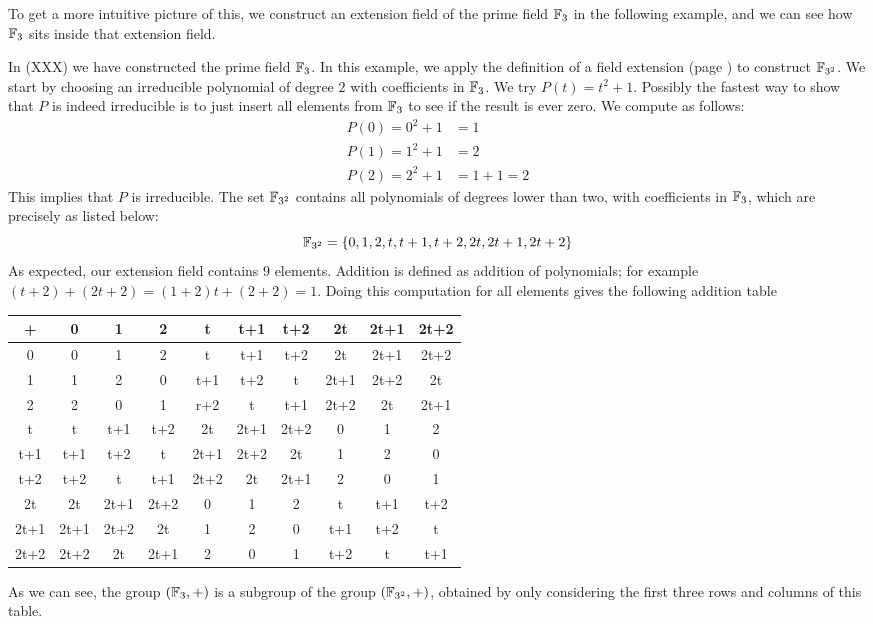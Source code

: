 To get a more intuitive picture of this, we construct an extension field of the prime field  $\mathbb{F}_3$ in the following example, and we can see how $\mathbb{F}_3$ sits inside that extension field.
\begin{example}In (XXX) we have constructed the prime field $\mathbb{F}_3$. In this example, we apply the definition of a field extension (page \pageref{field-extension}) to construct $\mathbb{F}_{3^2}$. We start by choosing an irreducible polynomial of degree $2$ with coefficients in $\mathbb{F}_3$. We try
$P(t)=t^2+1$. Possibly the fastest way to show that $P$ is indeed irreducible is to just insert all elements from $\mathbb{F}_3$ to see if the result is ever zero. We compute as follows:
\begin{align*}
P(0) = 0^2+1 &= 1\\
P(1) = 1^2+1 &= 2\\
P(2) = 2^2+1 &=  1+1  = 2
\end{align*}
This implies that $P$ is irreducible. The set $\mathbb{F}_{3^2}$ contains all polynomials of degrees lower than two, with coefficients in $\mathbb{F}_3$, which are precisely as listed below:
$$
\mathbb{F}_{3^2}=\{0,1,2,t,t+1,t+2,2t,2t+1,2t+2\}
$$
As expected, our extension field contains $9$ elements. Addition is  defined as addition of polynomials; for example $(t+2) + (2t+2)= (1+2)t +(2+2)= 1$. Doing this computation for all elements gives the following addition table
\begin{center}
  \begin{tabular}{c | c c c c c c c c c}
    + & 0    & 1    & 2    & t    & t+1  & t+2  & 2t   & 2t+1 & 2t+2 \\\hline
    0 & 0    & 1    & 2    & t    & t+1  & t+2  & 2t   & 2t+1 & 2t+2 \\
    1 & 1    & 2    & 0    & t+1  & t+2  & t    & 2t+1 & 2t+2 & 2t   \\
    2 & 2    & 0    & 1    & r+2  & t    & t+1  & 2t+2 & 2t   & 2t+1 \\
    t & t    & t+1  & t+2  & 2t   & 2t+1 & 2t+2 & 0    & 1    & 2    \\
  t+1 & t+1  & t+2  & t    & 2t+1 & 2t+2 & 2t   & 1    & 2    & 0    \\
  t+2 & t+2  & t    & t+1  & 2t+2 & 2t   & 2t+1 & 2    & 0    & 1    \\
   2t & 2t   & 2t+1 & 2t+2 & 0    & 1    & 2    & t    & t+1  & t+2  \\
 2t+1 & 2t+1 & 2t+2 & 2t   & 1    & 2    & 0    & t+1  & t+2  & t    \\
 2t+2 & 2t+2 & 2t   & 2t+1 & 2    & 0    & 1    & t+2  & t    & t+1
  \end{tabular}
\end{center}
As we can see, the group $(\mathbb{F}_3,+)$ is a subgroup of the group $(\mathbb{F}_{3^2},+)$, obtained by only considering the first three rows and columns of this table.


\end{example}

